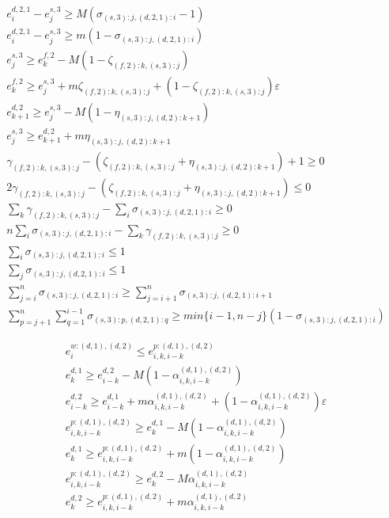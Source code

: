 \documentclass[]{interact}
\theoremstyle{plain}%
\theoremstyle{definition}
\theoremstyle{remark}
\begin{document}
\begin{eqnarray}
e^{d,2,1}_i-e^{s,3}_j\ge M(\sigma_{(s,3):j,(d,2,1):i}-1)\label{MergeErg:9.1}\\
e^{d,2,1}_i-e^{s,3}_j\ge m(1 - \sigma_{(s,3):j,(d,2,1):i})\\
e^{s,3}_{j} \ge e^{f,2}_{k} - M(1-\zeta_{(f,2):k,(s,3):j})\\ 
e^{f,2}_{k} \ge e^{s,3}_{j} + m\zeta_{(f,2):k,(s,3):j} +(1-\zeta_{(f,2):k,(s,3):j})\varepsilon\\ 
e^{d,2}_{k+1} \ge e^{s,3}_{j} - M(1-\eta_{(s,3):j,(d,2):k+1})\\
e^{s,3}_{j} \ge e^{d,2}_{k+1} + m\eta_{(s,3):j,(d,2):k+1}\\
\gamma_{(f,2):k,(s,3):j} - (\zeta_{(f,2):k,(s,3):j} + \eta_{(s,3):j,(d,2):k+1})+1\ge 0\\
2\gamma_{(f,2):k,(s,3):j}-(\zeta_{(f,2):k,(s,3):j} + \eta_{(s,3):j,(d,2):k+1})\le 0\\
\sum_k\gamma_{(f,2):k,(s,3):j}-\sum_i \sigma_{(s,3):j,(d,2,1):i} \ge 0\\
n\sum_{i}\sigma_{(s,3):j,(d,2,1):i} - \sum_k\gamma_{(f,2):k,(s,3):j}\ge 0\\
\sum_{i}\sigma_{(s,3):j,(d,2,1):i}\le 1\\
\sum_{j}\sigma_{(s,3):j,(d,2,1):i}\le 1\\
\sum_{j=i}^{n}\sigma_{(s,3):j,(d,2,1):i}\ge \sum_{j=i+1}^{n}\sigma_{(s,3):j,(d,2,1):i+1}\\
\sum_{p=j+1}^n\sum_{q=1}^{i-1} \sigma_{(s,3):p,(d,2,1):q} \ge min\{i-1,n-j\}(1-\sigma_{(s,3):j,(d,2,1):i})\label{MergeErg:9.2}
\end{eqnarray}


\begin{eqnarray}
e^{w:(d,1),(d,2)}_i\le e^{p:(d,1),(d,2)}_{i,k,i-k}\label{MergeErg:10.1}\\
e^{d,1}_k\ge e^{d,2}_{i-k} - M(1-\alpha^{(d,1),(d,2)}_{i,k,i-k})\\
e^{d,2}_{i-k} \ge e^{d,1}_{i-k} + m\alpha^{(d,1),(d,2)}_{i,k,i-k}+(1-\alpha^{(d,1),(d,2)}_{i,k,i-k})\varepsilon\\
e^{p:(d,1),(d,2)}_{i,k,i-k}\ge e^{d,1}_k - M(1-\alpha^{(d,1),(d,2)}_{i,k,i-k})\\
e^{d,1}_k\ge e^{p:(d,1),(d,2)}_{i,k,i-k}+m(1-\alpha^{(d,1),(d,2)}_{i,k,i-k})\\
e^{p:(d,1),(d,2)}_{i,k,i-k}\ge e^{d,2}_k - M\alpha^{(d,1),(d,2)}_{i,k,i-k}\\
e^{d,2}_k\ge e^{p:(d,1),(d,2)}_{i,k,i-k}+m\alpha^{(d,1),(d,2)}_{i,k,i-k}\label{MergeErg:10.2}
\end{eqnarray}
\end{document}
